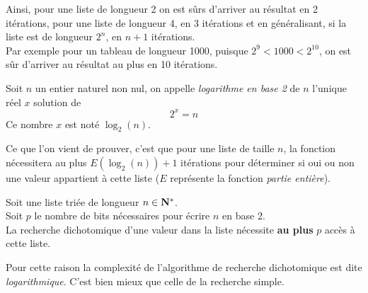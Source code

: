 Ainsi, pour une liste de longueur 2 on est sûrs d'arriver au résultat en 2 itérations, pour une liste de longueur 4, en 3 itérations et en généralisant, si la liste est de longueur $2^n$, en $n+1$ itérations.\\

Par exemple pour un tableau de longueur 1000, puisque $2^9<1000<2^{10}$, on est sûr d'arriver au résultat au plus en 10 itérations.\\

\begin{definition}[]
Soit $n$ un entier naturel non nul, on appelle \textit{logarithme en base 2} de $n$ l'unique réel $x$ solution de $$2^x=n$$
Ce nombre $x$ est noté $\log_2(n)$.

\end{definition}

Ce que l'on vient de prouver, c'est que pour une liste de taille $n$, la fonction\\
  nécessitera au plus $E(\log_2(n))+1$ itérations pour déterminer si oui ou non une valeur appartient à cette liste ($E$ représente la fonction \textit{partie entière}).\\
 
\begin{propriete}
Soit une liste triée de longueur $n\in\mathbf{N}^*$.\\
Soit $p$ le nombre de bits nécessaires pour écrire $n$ en base 2.\\

La recherche dichotomique d'une valeur dans la liste nécessite \textbf{au plus} $p$ accès à cette liste.
\end{propriete}

Pour cette raison la complexité de l'algorithme de recherche dichotomique est dite \textit{logarithmique}. C'est bien mieux que celle de la recherche simple.